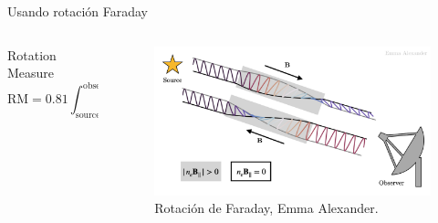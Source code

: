 \documentclass[xetex,aspectratio=169]{beamer}
\begin{document}
	\begin{frame}{Usando rotación Faraday}
		\begin{columns}
			
			\begin{column}{0.55\textwidth}
				
				
				
				\begin{block}{Rotation Measure}
					\begin{equation*}
						\text{RM} = 0.81 \int_{\text{source}}^{\text{observer}} n_e(r) B_{||}(r) \cdot dr\; \text{rad}\;\text{m}^{-2}
					\end{equation*}
				\end{block}
				
			\end{column}
			
			\begin{column}{0.45\textwidth}
				\begin{figure}
					\centering
					\includegraphics[width=\textwidth, keepaspectratio]{figures/faraday_rotation/faraday_rot.png}
					\caption*{Rotación de Faraday, Emma Alexander.}
				\end{figure}
			\end{column}
		\end{columns}
		
	\end{frame}
	
\end{document}
